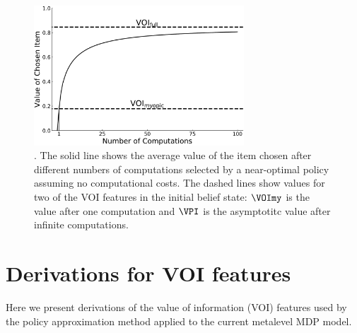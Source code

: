 \begin{figure}[b!]
  \centering
  \includegraphics[width=0.7\textwidth]{figs/attention/supp-voi-vpi.pdf}
  \caption{.
    The solid line shows the average value of the item chosen after different numbers of computations selected by a near-optimal policy assuming no computational costs. The dashed lines show values for two of the VOI features in the initial belief state: $\VOImy$ is the value after one computation and $\VPI$ is the asymptotitc value after infinite computations.
  }
  \label{fig:attention-voi}
\end{figure}


\section{Derivations for VOI features}\label{app:attention-derivations}

Here we present derivations of the value of information (VOI) features used by the policy approximation method \citep{callaway2018learning} applied to the current metalevel MDP model.

